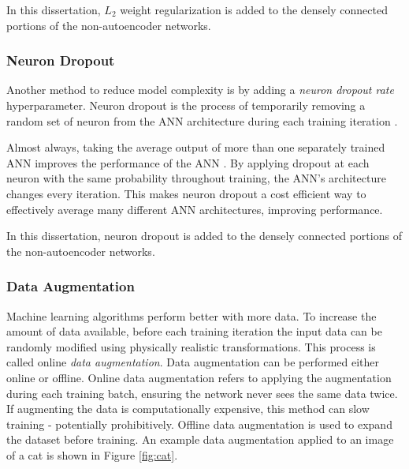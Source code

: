 In this dissertation, $L_2$ weight regularization is added to the densely connected portions of the non-autoencoder networks.

\subsubsection{Neuron Dropout}

Another method to reduce model complexity is by adding a \textit{neuron dropout rate} hyperparameter. Neuron dropout is the process of temporarily removing a random set of neuron from the ANN architecture during each training iteration \cite{Srivastava2014}.

Almost always, taking the average output of more than one separately trained ANN improves the performance of the ANN \cite{Srivastava2014}. By applying dropout at each neuron with the same probability throughout training, the ANN's architecture changes every iteration. This makes neuron dropout a cost efficient way to effectively average many different ANN architectures, improving performance. 


In this dissertation, neuron dropout is added to the densely connected portions of the non-autoencoder networks.


\subsubsection{Data Augmentation}

Machine learning algorithms perform better with more data. To increase the amount of data available, before each training iteration the input data can be randomly modified using physically realistic transformations. This process is called online \textit{data augmentation}. Data augmentation can be performed either online or offline. Online data augmentation refers to applying the augmentation during each training batch, ensuring the network never sees the same data twice. If augmenting the data is computationally expensive, this method can slow training - potentially prohibitively. Offline data augmentation is used to expand the dataset before training. An example data augmentation applied to an image of a cat is shown in Figure \ref{fig:cat}.

